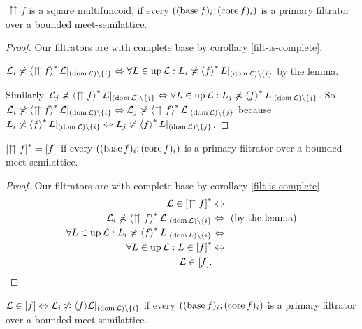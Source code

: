 \begin{prop}
$\upuparrows f$ is a square multifuncoid, if every $((\operatorname{base} f)_{i};(\operatorname{core} f)_{i})$
is a primary filtrator over a bounded meet-semilattice.\end{prop}
\begin{proof}
Our filtrators are with complete base by corollary \ref{filt-is-complete}.

$\mathcal{L}_{i}\not\asymp\left\langle \upuparrows f\right\rangle ^{\ast}\mathcal{L}|_{(\operatorname{dom}\mathcal{L})\setminus\{i\}}\Leftrightarrow\forall L\in\operatorname{up}\mathcal{L}:L_{i}\not\asymp\left\langle f\right\rangle ^{\ast}L|_{(\operatorname{dom}\mathcal{L})\setminus\{i\}}$
by the lemma.

Similarly $\mathcal{L}_{j}\not\asymp\left\langle \upuparrows f\right\rangle ^{\ast}\mathcal{L}|_{(\operatorname{dom}\mathcal{L})\setminus\{j\}}\Leftrightarrow\forall L\in\operatorname{up}\mathcal{L}:L_{j}\not\asymp\left\langle f\right\rangle ^{\ast}L|_{(\operatorname{dom}\mathcal{L})\setminus\{j\}}$.
So $\mathcal{L}_{i}\not\asymp\left\langle \upuparrows f\right\rangle ^{\ast}\mathcal{L}|_{(\operatorname{dom}\mathcal{L})\setminus\{i\}}\Leftrightarrow\mathcal{L}_{j}\not\asymp\left\langle \upuparrows f\right\rangle ^{\ast}\mathcal{L}|_{(\operatorname{dom}\mathcal{L})\setminus\{j\}}$
because $L_{i}\not\asymp\left\langle f\right\rangle ^{\ast}L|_{(\operatorname{dom}\mathcal{L})\setminus\{i\}}\Leftrightarrow L_{j}\not\asymp\left\langle f\right\rangle ^{\ast}L|_{(\operatorname{dom}\mathcal{L})\setminus\{j\}}$.\end{proof}
\begin{prop}
$\mathord{\mathrel{\left[\upuparrows f\right]^{\ast}}}=\mathord{\mathrel{\left[f\right]}}$ if every
$((\operatorname{base} f)_{i};(\operatorname{core} f)_{i})$ is a primary filtrator over a bounded meet-semilattice.\end{prop}
\begin{proof}
Our filtrators are with complete base by corollary \ref{filt-is-complete}.
\begin{align*}
\mathcal{L}\in\mathord{\mathrel{\left[\upuparrows f\right]^{\ast}}} & \Leftrightarrow\\
\mathcal{L}_{i}\not\asymp\left\langle \upuparrows f\right\rangle ^{\ast}\mathcal{L}|_{(\operatorname{dom}\mathcal{L})\setminus\{i\}} & \Leftrightarrow\text{ (by the lemma)}\\
\forall L\in\operatorname{up}\mathcal{L}:L_{i}\not\asymp\left\langle f\right\rangle ^{\ast}L|_{(\operatorname{dom} L)\setminus\{i\}} & \Leftrightarrow\\
\forall L\in\operatorname{up}\mathcal{L}:L\in\mathord{\mathrel{\left[f\right]^{\ast}}} & \Leftrightarrow\\
\mathcal{L}\in\mathord{\mathrel{\left[f\right]}}.
\end{align*}
\end{proof}
\begin{prop}
$\mathcal{L}\in\mathord{\mathrel{\left[f\right]}}\Leftrightarrow\mathcal{L}_{i}\not\asymp\langle f\rangle\mathcal{L}|_{(\operatorname{dom}\mathcal{L})\setminus\{i\}}$
if every $((\operatorname{base} f)_{i};(\operatorname{core} f)_{i})$ is a primary filtrator over
a bounded meet-semilattice.\end{prop}
